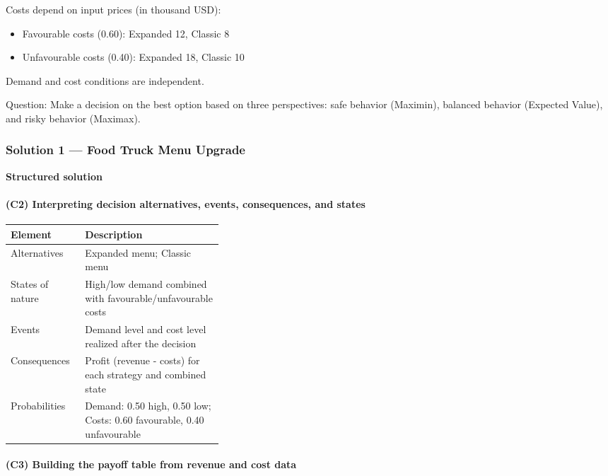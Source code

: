 Costs depend on input prices (in thousand USD):

\begin{itemize}
	\item Favourable costs (0.60): Expanded 12, Classic 8
	\item Unfavourable costs (0.40): Expanded 18, Classic 10
\end{itemize}

Demand and cost conditions are independent.

Question: Make a decision on the best option based on three perspectives: safe behavior (Maximin), balanced behavior (Expected Value), and risky behavior (Maximax).

\subsubsection{Solution 1 --- Food Truck Menu Upgrade}\label{subsec:practice-activity-2-solution-1}

\textbf{Structured solution}

\paragraph{(C2) Interpreting decision alternatives, events, consequences, and states}\label{subsubsec:practice-activity-2-solution-1-c2}

\begin{center}
	\begin{tabularx}{\linewidth}{@{}L{0.35\linewidth}Y@{}}
		\toprule
		Element & Description \\
		\midrule
		Alternatives & Expanded menu; Classic menu \\
		States of nature & High/low demand combined with favourable/unfavourable costs \\
		Events & Demand level and cost level realized after the decision \\
		Consequences & Profit (revenue - costs) for each strategy and combined state \\
		Probabilities & Demand: 0.50 high, 0.50 low; Costs: 0.60 favourable, 0.40 unfavourable \\
		\bottomrule
	\end{tabularx}
\end{center}

\paragraph{(C3) Building the payoff table from revenue and cost data}\label{subsubsec:practice-activity-2-solution-1-c3}

